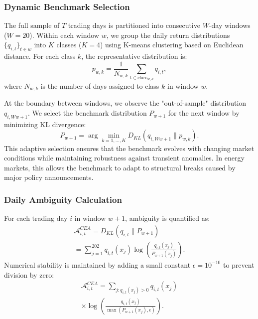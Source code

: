 \documentclass[preprint,12pt,authoryear]{elsarticle}
\begin{document}
\subsubsection{Dynamic Benchmark Selection}

The full sample of $T$ trading days is partitioned into consecutive $W$-day windows ($W = 20$). Within each window $w$, we group the daily return distributions $\{q_{i,t}\}_{t \in w}$ into $K$ classes ($K = 4$) using K-means clustering based on Euclidean distance. For each class $k$, the representative distribution is:
\begin{equation}
p_{w,k} = \frac{1}{N_{w,k}} \sum_{t \in \text{class}_{w,k}} q_{i,t},
\end{equation}
where $N_{w,k}$ is the number of days assigned to class $k$ in window $w$.

At the boundary between windows, we observe the "out-of-sample" distribution $q_{i,Ww+1}$. We select the benchmark distribution $P_{w+1}$ for the next window by minimizing KL divergence:
\begin{equation}
P_{w+1} = \arg\min_{k=1,\ldots,K} D_{KL}(q_{i,Ww+1} \| p_{w,k}).
\end{equation}
This adaptive selection ensures that the benchmark evolves with changing market conditions while maintaining robustness against transient anomalies. In energy markets, this allows the benchmark to adapt to structural breaks caused by major policy announcements.

\subsubsection{Daily Ambiguity Calculation}

For each trading day $i$ in window $w+1$, ambiguity is quantified as:
\begin{equation}
\begin{split}
\mathcal{A}^{CEA}_{i,t} = D_{KL}(q_{i,t} \| P_{w+1}) \\
= \sum_{j=1}^{202} q_{i,t}(x_j) \log\left(\frac{q_{i,t}(x_j)}{P_{w+1}(x_j)}\right).
\end{split}
\end{equation}
Numerical stability is maintained by adding a small constant $\epsilon = 10^{-10}$ to prevent division by zero:
\begin{equation}
\begin{split}
\mathcal{A}^{CEA}_{i,t} = \sum_{j: q_{i,t}(x_j) > 0} q_{i,t}(x_j) \\
\times \log\left(\frac{q_{i,t}(x_j)}{\max(P_{w+1}(x_j), \epsilon)}\right).
\end{split}
\end{equation}
\end{document}
